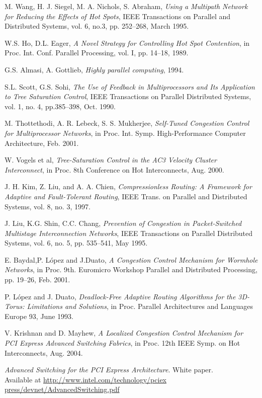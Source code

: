 \begin{thebibliography}{99}
 M. Wang, H. J. Siegel, M. A. Nichols, S. Abraham, \emph{Using a Multipath Network for Reducing the Effects of Hot Spots}, IEEE Transactions on Parallel and Distributed Systems, vol. 6, no.3, pp. 252--268, March 1995.

 W.S. Ho, D.L. Eager, \emph{A Novel Strategy for Controlling Hot Spot Contention}, in Proc. Int. Conf. Parallel Processing, vol. I, pp. 14--18, 1989.

 G.S. Almasi, A. Gottlieb, \emph{Highly parallel computing}, 1994.

 S.L. Scott, G.S. Sohi, \emph{The Use of Feedback in Multiprocessors and Its Application to Tree Saturation Control}, IEEE Transactions on Parallel Distributed Systems, vol. 1, no. 4, pp.385--398, Oct. 1990.

 M. Thottethodi, A. R. Lebeck, S. S. Mukherjee, \emph{Self-Tuned Congestion Control for Multiprocessor Networks}, in Proc. Int. Symp. High-Performance Computer Architecture, Feb. 2001.

 W. Vogels et al, \emph{Tree-Saturation Control in the AC3 Velocity Cluster Interconnect}, in Proc. 8th Conference on Hot Interconnects, Aug. 2000.

 J. H. Kim, Z. Liu, and A. A. Chien, \emph{Compressionless Routing: A Framework for Adaptive and Fault-Tolerant Routing}, IEEE Trans. on Parallel and Distributed Systems, vol. 8, no. 3, 1997.

 J. Liu, K.G. Shin, C.C. Chang, \emph{Prevention of Congestion in Packet-Switched Multistage Interconnection Networks}, IEEE Transactions on Parallel Distributed Systems, vol. 6, no. 5, pp. 535--541, May 1995.

 E. Baydal,P. L\'opez and J.Duato, \emph{A Congestion Control Mechanism for Wormhole Networks}, in Proc. 9th. Euromicro Workshop Parallel and Distributed Processing, pp. 19--26, Feb. 2001.

 P. L\'opez and J. Duato, \emph{Deadlock-Free Adaptive Routing Algorithms for the 3D-Torus: Limitations and Solutions}, in Proc. Parallel Architectures and Languages Europe 93, June 1993.

 V. Krishnan and D. Mayhew, \emph{A Localized Congestion Control Mechanism for PCI Express Advanced Switching Fabrics}, in Proc. 12th IEEE Symp. on Hot Interconnects, Aug. 2004.

 \emph{Advanced Switching for the PCI Express Architecture}. White paper.\\
Available at \url{http://www.intel.com/technology/pciex press/devnet/AdvancedSwitching.pdf}

\end{thebibliography}


